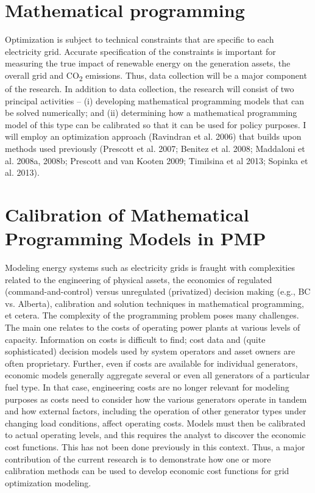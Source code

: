 \section{Mathematical programming}\label{mathematical-programming}

Optimization is subject to technical constraints that are specific to
each electricity grid. Accurate specification of the constraints is
important for measuring the true impact of renewable energy on the
generation assets, the overall grid and CO\textsubscript{2} emissions.
Thus, data collection will be a major component of the research. In
addition to data collection, the research will consist of two principal
activities -- (i) developing mathematical programming models that can be
solved numerically; and (ii) determining how a mathematical programming
model of this type can be calibrated so that it can be used for policy
purposes. I will employ an optimization approach (Ravindran et al. 2006)
that builds upon methods used previously (Prescott et al. 2007; Benitez
et al. 2008; Maddaloni et al. 2008a, 2008b; Prescott and van Kooten
2009; Timilsina et al 2013; Sopinka et al. 2013).

\section{Calibration of Mathematical Programming Models in
	PMP}\label{calibration-of-mathematical-programming-models-in-pmp}

Modeling energy systems such as electricity grids is fraught with
complexities related to the engineering of physical assets, the
economics of regulated (command-and-control) versus unregulated
(privatized) decision making (e.g., BC vs. Alberta), calibration and
solution techniques in mathematical programming, et cetera. The
complexity of the programming problem poses many challenges. The main
one relates to the costs of operating power plants at various levels of
capacity. Information on costs is difficult to find; cost data and
(quite sophisticated) decision models used by system operators and asset
owners are often proprietary. Further, even if costs are available for
individual generators, economic models generally aggregate several or
even all generators of a particular fuel type. In that case, engineering
costs are no longer relevant for modeling purposes as costs need to
consider how the various generators operate in tandem and how external
factors, including the operation of other generator types under changing
load conditions, affect operating costs. Models must then be calibrated
to actual operating levels, and this requires the analyst to discover
the economic cost functions. This has not been done previously in this
context. Thus, a major contribution of the current research is to
demonstrate how one or more calibration methods can be used to develop
economic cost functions for grid optimization modeling.

